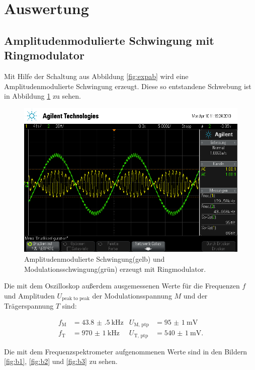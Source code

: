 \section{Auswertung}
\label{sec:Auswertung}

\subsection{Amplitudenmodulierte Schwingung mit Ringmodulator}

Mit Hilfe der Schaltung aus Abbildung \ref{fig:expab} wird eine Amplitudenmodulierte Schwingung erzeugt.
Diese so entstandene Schwebung ist in Abbildung \ref{fig:amplModOszi} zu sehen.

\begin{figure}[h]
  \centering
  \includegraphics[width=.9\textwidth]{Oszi_Pics/amplModRing.png}
  \caption{Amplitudenmodulierte Schwingung(gelb) und Modulationsschwingung(grün) erzeugt mit Ringmodulator.}
  \label{fig:amplModOszi}
\end{figure}

Die mit dem Oszilloskop außerdem ausgemessenen Werte für die Frequenzen $f$ und Amplituden $U_\text{peak to peak}$ der Modulationsspannung $M$ und der Trägerspannung $T$ sind:

\begin{align*}
  f_\text{M} &= \SI{43.8(5)}{\kilo\hertz} & U_\text{M, ptp} &= \SI{95(1)}{\milli\volt}\\
  f_\text{T} &= \SI{970(1)}{\kilo\hertz} & U_\text{T, ptp} &= \SI{540(1)}{\milli\volt}.
\end{align*}

Die mit dem Frequenzspektrometer aufgenommenen Werte sind in den Bildern \ref{fig:b1}, \ref{fig:b2} und \ref{fig:b3} zu sehen.


